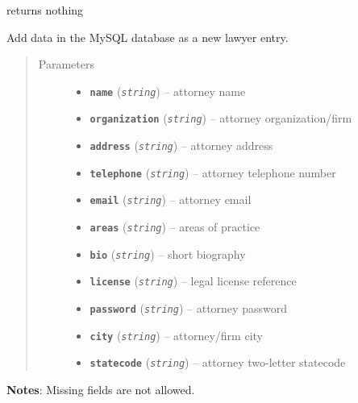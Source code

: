\documentclass[letterpaper,10pt,english]{sphinxmanual}
\begin{document}

\begin{fulllineitems}
\label{DBOps:DBOps.addLawyer}
returns nothing

Add data in the MySQL database as a new lawyer entry.
\begin{quote}\begin{description}
\item[{Parameters}] \leavevmode\begin{itemize}
\item {} 
\textbf{\texttt{name}} (\emph{\texttt{string}}) -- attorney name

\item {} 
\textbf{\texttt{organization}} (\emph{\texttt{string}}) -- attorney organization/firm

\item {} 
\textbf{\texttt{address}} (\emph{\texttt{string}}) -- attorney address

\item {} 
\textbf{\texttt{telephone}} (\emph{\texttt{string}}) -- attorney telephone number

\item {} 
\textbf{\texttt{email}} (\emph{\texttt{string}}) -- attorney email

\item {} 
\textbf{\texttt{areas}} (\emph{\texttt{string}}) -- areas of practice

\item {} 
\textbf{\texttt{bio}} (\emph{\texttt{string}}) -- short biography

\item {} 
\textbf{\texttt{license}} (\emph{\texttt{string}}) -- legal license reference

\item {} 
\textbf{\texttt{password}} (\emph{\texttt{string}}) -- attorney password

\item {} 
\textbf{\texttt{city}} (\emph{\texttt{string}}) -- attorney/firm city

\item {} 
\textbf{\texttt{statecode}} (\emph{\texttt{string}}) -- attorney two-letter statecode

\end{itemize}

\end{description}\end{quote}

\textbf{Notes}:
Missing fields are not allowed.

\end{fulllineitems}
\end{document}
